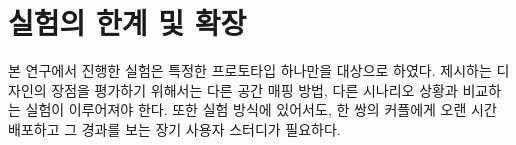 



\section{실험의 한계 및 확장}
본 연구에서 진행한 실험은 특정한 프로토타입 하나만을 대상으로 하였다. 제시하는 디자인의 장점을 평가하기 위해서는 다른 공간 매핑 방법, 다른 시나리오 상황과 비교하는 실험이 이루어져야 한다. 또한 실험 방식에 있어서도, 한 쌍의 커플에게 오랜 시간 배포하고 그 경과를 보는 장기 사용자 스터디가 필요하다.



